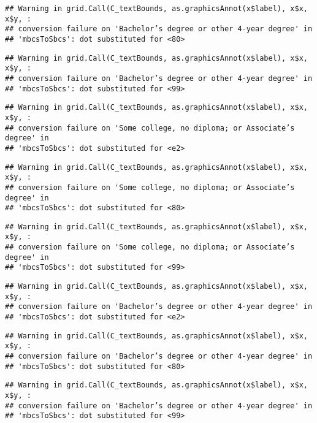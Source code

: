\documentclass[
]{article}
\begin{document}
\begin{verbatim}
## Warning in grid.Call(C_textBounds, as.graphicsAnnot(x$label), x$x, x$y, :
## conversion failure on 'Bachelor’s degree or other 4-year degree' in
## 'mbcsToSbcs': dot substituted for <80>
\end{verbatim}

\begin{verbatim}
## Warning in grid.Call(C_textBounds, as.graphicsAnnot(x$label), x$x, x$y, :
## conversion failure on 'Bachelor’s degree or other 4-year degree' in
## 'mbcsToSbcs': dot substituted for <99>
\end{verbatim}

\begin{verbatim}
## Warning in grid.Call(C_textBounds, as.graphicsAnnot(x$label), x$x, x$y, :
## conversion failure on 'Some college, no diploma; or Associate’s degree' in
## 'mbcsToSbcs': dot substituted for <e2>
\end{verbatim}

\begin{verbatim}
## Warning in grid.Call(C_textBounds, as.graphicsAnnot(x$label), x$x, x$y, :
## conversion failure on 'Some college, no diploma; or Associate’s degree' in
## 'mbcsToSbcs': dot substituted for <80>
\end{verbatim}

\begin{verbatim}
## Warning in grid.Call(C_textBounds, as.graphicsAnnot(x$label), x$x, x$y, :
## conversion failure on 'Some college, no diploma; or Associate’s degree' in
## 'mbcsToSbcs': dot substituted for <99>
\end{verbatim}

\begin{verbatim}
## Warning in grid.Call(C_textBounds, as.graphicsAnnot(x$label), x$x, x$y, :
## conversion failure on 'Bachelor’s degree or other 4-year degree' in
## 'mbcsToSbcs': dot substituted for <e2>
\end{verbatim}

\begin{verbatim}
## Warning in grid.Call(C_textBounds, as.graphicsAnnot(x$label), x$x, x$y, :
## conversion failure on 'Bachelor’s degree or other 4-year degree' in
## 'mbcsToSbcs': dot substituted for <80>
\end{verbatim}

\begin{verbatim}
## Warning in grid.Call(C_textBounds, as.graphicsAnnot(x$label), x$x, x$y, :
## conversion failure on 'Bachelor’s degree or other 4-year degree' in
## 'mbcsToSbcs': dot substituted for <99>
\end{verbatim}
\end{document}
